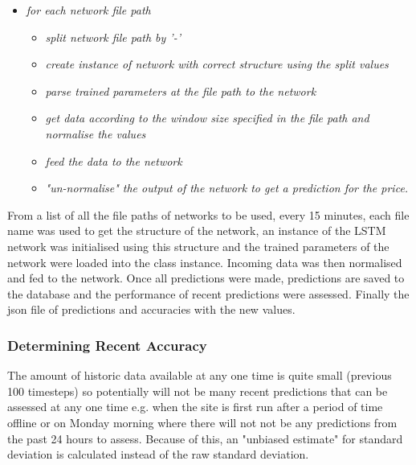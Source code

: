             \begin{itemize}
                \item \textit{for each network file path}
                    \begin{itemize}
                        \item \textit{split network file path by '-'}
                        \item \textit{create instance of network with correct structure using the split values}
                        \item \textit{parse trained parameters at the file path to the network }
                        \item \textit{get data according to the window size specified in the file path and normalise the values}
                        \item \textit{feed the data to the network}
                        \item \textit{"un-normalise" the output of the network to get a prediction for the price.}
                    \end{itemize}
            \end{itemize}
            
        
            From a list of all the file paths of networks to be used, every 15 minutes, each file name was used to get the structure of the network, an instance of the LSTM network was initialised using this structure and the trained parameters of the network were loaded into the class instance. Incoming data was then normalised and fed to the network. Once all predictions were made, predictions are saved to the database and the performance of recent predictions were assessed. Finally the json file of predictions and accuracies with the new values.


            \subsubsection{Determining Recent Accuracy}
            
            The amount of historic data available at any one time is quite small (previous 100 timesteps) so potentially will not be many recent predictions that can be assessed at any one time e.g. when the site is first run after a period of time offline or on Monday morning where there will not not be any predictions from the past 24 hours to assess. Because of this, an "unbiased estimate" for standard deviation is calculated instead of the raw standard deviation.

